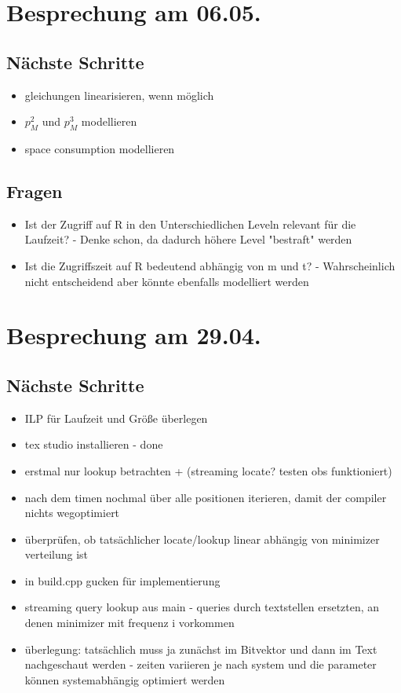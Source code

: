 \documentclass{article}
\begin{document}
\section*{Besprechung am 06.05.}
\subsection*{Nächste Schritte}
	\begin{itemize}
		\item gleichungen linearisieren, wenn möglich
		\item $p_M^2$ und $p_M^3$ modellieren
		\item space consumption modellieren
	\end{itemize}
\subsection*{Fragen}
	\begin{itemize}
		\item Ist der Zugriff auf R in den Unterschiedlichen Leveln relevant für die Laufzeit? - Denke schon, da dadurch höhere Level "bestraft" werden
		\item Ist die Zugriffszeit auf R bedeutend abhängig von m und t? - Wahrscheinlich nicht entscheidend aber könnte ebenfalls modelliert werden
	\end{itemize}

\section*{Besprechung am 29.04.}
\subsection*{Nächste Schritte}
	\begin{itemize}
		\item ILP für Laufzeit und Größe überlegen
		
		\item tex studio installieren - done
		
		\item erstmal nur lookup betrachten + (streaming locate? testen obs funktioniert)
		
		\item nach dem timen nochmal über alle positionen iterieren, damit der compiler nichts wegoptimiert
		
		\item überprüfen, ob tatsächlicher locate/lookup linear abhängig von minimizer verteilung ist
		
		\item in build.cpp gucken für implementierung
		\item streaming query lookup aus main - queries durch textstellen ersetzten, an denen minimizer mit frequenz i vorkommen
		
		\item überlegung: tatsächlich muss ja zunächst im Bitvektor und dann im Text nachgeschaut werden - zeiten variieren je nach system und die parameter können systemabhängig optimiert werden
	\end{itemize}
\end{document}
